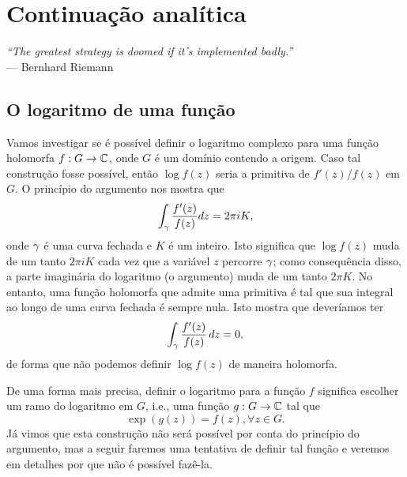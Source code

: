 \chapter[Continuação analítica]{Continuação analítica}
\chaptermark{}

\hfill%
\begin{minipage}{10cm}
    \begin{flushright}
    \rightskip=0.5cm
        \textit{``The greatest strategy is doomed if it's implemented badly.''}
        \\[0.1cm]
    \rightskip=0.5cm
    --- Bernhard Riemann
    \end{flushright}
\end{minipage}

\section{O logaritmo de uma função}

    Vamos investigar se é possível definir o logaritmo complexo para uma função holomorfa 
    $f: G \to \mathbb{C}$, onde $G$ é um domínio contendo a origem. 
    Caso tal construção fosse possível, então $\log f(z)$ seria a primitiva de $f'(z)/f(z)$ em $G$. 
    O princípio do argumento nos mostra que
    \begin{equation*}
        \int_\gamma \frac{f'(z)}{f(z)} dz = 2\pi i K ,
    \end{equation*}
    onde $\gamma$ é uma curva fechada e $K$ é um inteiro. 
    Isto significa que $\log f(z)$ muda de um tanto $2\pi i K$ cada vez que a variável $z$ 
    percorre $\gamma$; como consequência disso, a parte imaginária do logaritmo (o argumento) muda de um tanto $2 \pi K$. 
    No entanto, uma função holomorfa que admite uma primitiva é tal que sua integral ao longo de uma curva fechada é sempre nula. Isto mostra que deveríamos ter
    \begin{equation*}
        \int_\gamma \frac{f'(z)}{f(z)} \, dz = 0,
    \end{equation*}
    de forma que não podemos definir $\log f(z)$ de maneira holomorfa.
    
    De uma forma mais precisa, definir o logaritmo para a função $f$ significa escolher um ramo 
    do logaritmo em $G$, i.e., uma função $g: G \to \mathbb{C}$ tal que 
    \begin{equation*}
        \exp(g(z)) = f(z), \forall z \in G.  
    \end{equation*}
    Já vimos que esta construção não será possível por conta do princípio do argumento, mas a
    seguir faremos uma tentativa de definir tal função e veremos em detalhes por que não é 
    possível fazê-la.
    
